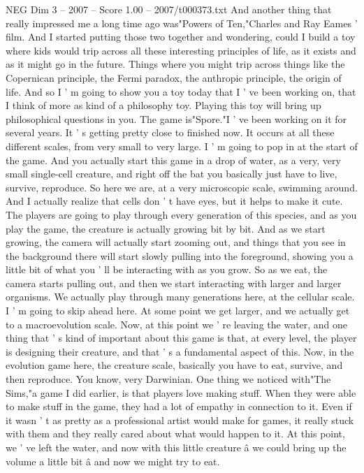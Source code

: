 \begin{textsample}{NEG Dim 3 – 2007 – Score 1.00 – 2007/t000373.txt}
And another thing that really impressed me a long time ago was"Powers of Ten,"Charles and Ray Eames ' film.
And I started putting those two together and wondering, could I build a toy where kids would trip across all these interesting principles of life, as it exists and as it might go in the future.
Things where you might trip across things like the Copernican principle, the Fermi paradox, the anthropic principle, the origin of life.
And so I ' m going to show you a toy today that I ' ve been working on, that I think of more as kind of a philosophy toy.
Playing this toy will bring up philosophical questions in you.
The game is"Spore."I ' ve been working on it for several years.
It ' s getting pretty close to finished now.
It occurs at all these different scales, from very small to very large.
I ' m going to pop in at the start of the game.
And you actually start this game in a drop of water, as a very, very small single-cell creature, and right off the bat you basically just have to live, survive, reproduce.
So here we are, at a very microscopic scale, swimming around.
And I actually realize that cells don ' t have eyes, but it helps to make it cute.
The players are going to play through every generation of this species, and as you play the game, the creature is actually growing bit by bit.
And as we start growing, the camera will actually start zooming out, and things that you see in the background there will start slowly pulling into the foreground, showing you a little bit of what you ' ll be interacting with as you grow.
So as we eat, the camera starts pulling out, and then we start interacting with larger and larger organisms.
We actually play through many generations here, at the cellular scale.
I ' m going to skip ahead here.
At some point we get larger, and we actually get to a macroevolution scale.
Now, at this point we ' re leaving the water, and one thing that ' s kind of important about this game is that, at every level, the player is designing their creature, and that ' s a fundamental aspect of this.
Now, in the evolution game here, the creature scale, basically you have to eat, survive, and then reproduce.
You know, very Darwinian.
One thing we noticed with"The Sims,"a game I did earlier, is that players love making stuff.
When they were able to make stuff in the game, they had a lot of empathy in connection to it.
Even if it wasn ' t as pretty as a professional artist would make for games, it really stuck with them and they really cared about what would happen to it.
At this point, we ' ve left the water, and now with this little creature â we could bring up the volume a little bit â and now we might try to eat.

\end{textsample}
